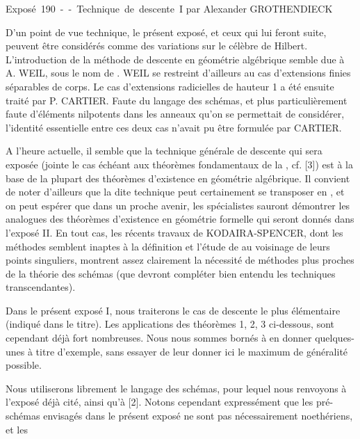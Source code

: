 \unit{Exposé 190 -- Technique de descente I}
%
  {par Alexander GROTHENDIECK}

D'un point de vue technique, le présent exposé, et ceux qui lui feront suite,
peuvent être considérés comme des variations sur le célèbre  de
Hilbert. L'introduction de la méthode de descente en géométrie algébrique semble
due à A. WEIL, sous le nom de . WEIL se restreint
d'ailleurs au cas d'extensions finies séparables de corps. Le cas d'extensions
radicielles de hauteur 1 a été ensuite traité par P. CARTIER. Faute du langage
des schémas, et plus particulièrement faute d'éléments nilpotents dans les
anneaux qu'on se permettait de considérer, l'identité essentielle entre ces
deux cas n'avait pu être formulée par CARTIER.

A l'heure actuelle, il semble que la technique générale de descente qui sera
exposée (jointe le cas échéant aux théorèmes fondamentaux de la , cf. [3]) est à la base de la plupart des théorèmes d'existence en
géométrie algébrique. Il convient de noter d'ailleurs que la dite
technique peut certainement se transposer en , et on
peut espérer que dans un proche avenir, les spécialistes sauront démontrer les
analogues  des théorèmes d'existence en géométrie formelle qui
seront donnés dans l'exposé II. En tout cas, les récents travaux de
KODAIRA-SPENCER, dont les méthodes semblent inaptes à la définition et l'étude
de  au voisinage de leurs points singuliers, montrent
assez clairement la nécessité de méthodes plus proches de la théorie des
schémas (que devront compléter bien entendu les techniques transcendantes).

Dans le présent exposé I, nous traiterons le cas de descente le plus élémentaire
(indiqué dans le titre). Les applications des théorèmes 1, 2, 3 ci-dessous, sont
cependant déjà fort nombreuses. Nous nous sommes bornés à en donner quelques-unes
à titre d'exemple, sans essayer de leur donner ici le maximum de généralité
possible.

Nous utiliserons librement le langage des schémas, pour lequel nous renvoyons à
l'exposé déjà cité, ainsi qu'à [2]. Notons cependant expressément que les
pré-schémas envisagés dans le présent exposé ne sont pas nécessairement
noethériens, et les

